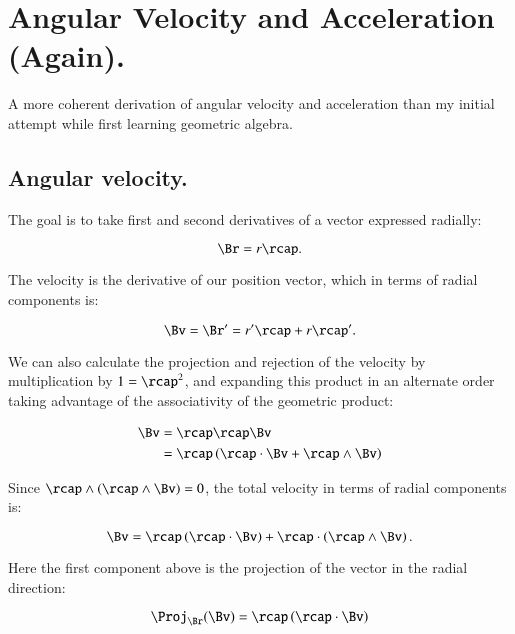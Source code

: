 \chapter{Angular Velocity and Acceleration (Again).}\label{chap:PJAngAcc}
\date{June 10, 2008.  Last Revision: $Date: 2009/06/04 13:13:27 $ }

A more coherent derivation of angular velocity and acceleration than
my initial attempt while first learning geometric algebra.

\section{Angular velocity. }

The goal is to take first and second derivatives of a vector expressed radially:

\begin{equation}
\Br = r \rcap.
\end{equation}

The velocity is the derivative of our position vector, which in terms of radial components is:

\begin{equation}\label{eqn:angular_acc:velocityasrcapprime}
\Bv = \Br' = r' \rcap + r \rcap'.
\end{equation}

We can also calculate the projection and rejection of the velocity by multiplication by $1 = \rcap^2$, and expanding
this product in an alternate order taking advantage of the associativity of the geometric product:

\begin{align*}
\Bv &= \rcap \rcap \Bv \\
    &= \rcap \left ( \rcap \cdot \Bv + \rcap \wedge \Bv \right) \\
\end{align*}

Since $\rcap \wedge (\rcap \wedge \Bv) = 0$, the total velocity in terms of radial components is:

\begin{equation}\label{eqn:angular_acc:velocityprojrej}
\Bv = \rcap \left(\rcap \cdot \Bv\right) + \rcap \cdot \left(\rcap \wedge \Bv\right).
\end{equation}

Here the first component above is the projection of the vector in the radial direction:

\[
\Proj_{\Br}(\Bv) = \rcap \left(\rcap \cdot \Bv\right)
\]

